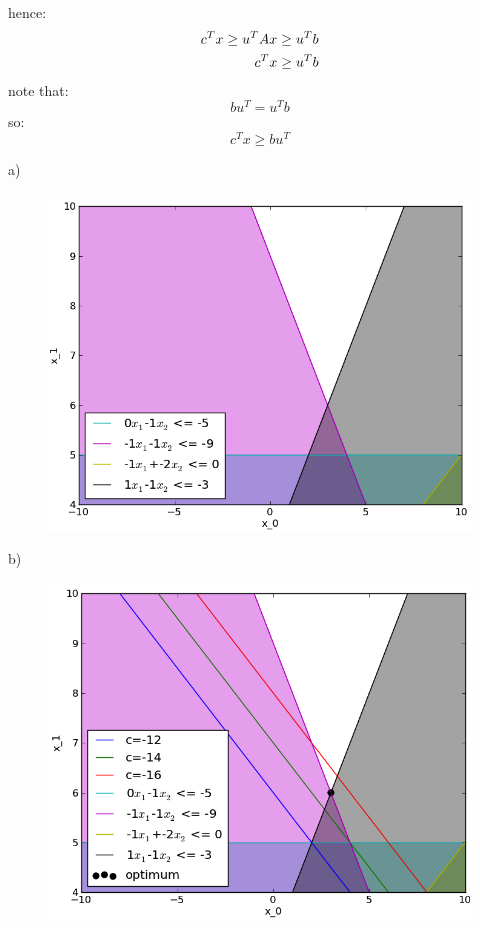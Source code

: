 \documentclass[12pt]{article}
\begin{document}
hence: 
\begin{align}
  c^Tx \geq u^TAx \geq u^Tb \\
  c^Tx \geq u^Tb \notag
\end{align}
note that:
\begin{equation}
  bu^T = u^Tb 
\end{equation}
so: 
\begin{equation}
c^Tx \geq bu^T
\end{equation}


\pagebreak
\setcounter{equation}{0}
a)
\begin{figure}[H]
 \includegraphics[width=\textwidth]{4_a}
\end{figure}
\pagebreak
b)
\begin{figure}[H]
\includegraphics[width=\textwidth]{4_b}
\end{figure}
\end{document}
